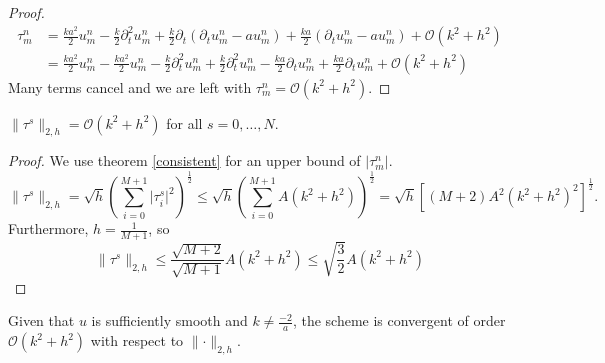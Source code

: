 \begin{proof}
    \begin{align*}
      \tau_m^n &= \frac{ka^2}{2}u_{m}^{n}  - \frac{k}{2} \partial_t^2 u_{m}^{n} + \frac{k}{2} \partial_t \left(\partial_t u_{m}^{n}   - au_{m}^{n} \right) + \frac{ka}{2} \left( \partial_t  u_{m}^{n} - a u_{m}^{n}\right)+ \mathcal{O}(k^2 + h^2) \\
                                                                                  &= \frac{ka^2}{2}u_{m}^{n} - \frac{ka^2}{2}u_{m}^{n}  - \frac{k}{2} \partial_t^2 u_{m}^{n} + \frac{k}{2} \partial_t^2 u_{m}^{n} - \frac{ka}{2} \partial_t u_{m}^{n} + \frac{ka}{2} \partial_t  u_{m}^{n}+ \mathcal{O}(k^2 + h^2)
    \end{align*}
    Many terms cancel and we are left with \( \tau_m^n = \mathcal{O}(k^2 + h^2) \).
\end{proof}

\begin{corollary}
    \label{corollary:norm_tau}
    $\lVert\tau^s \rVert_{2, h} =\mathcal{O}(k^2 + h^2)$ for all \( s = 0, \dots, N \).
\end{corollary}

\begin{proof}
We use theorem \ref{consistent} for an upper bound of $\lvert \tau_m^n\lvert$.
    $$
    \lVert\tau^s \lVert_{2, h} = \sqrt{h}\left( \sum_{i=0}^{M+1} \lvert\tau^s_i \lvert^2 \right)^\frac{1}{2} \leq \sqrt{h}\left( \sum_{i=0}^{M+1} A(k^2 + h^2) \right)^\frac{1}{2} = \sqrt{h}\left[ (M+2) A^2(k^2+h^2)^2 \right]^\frac{1}{2}.
    $$
    Furthermore, $h = \frac{1}{M+1}$, so
    $$\lVert\tau^s \lVert_{2, h}
      \le \frac{\sqrt{M+2}}{\sqrt{M+1}}A(k^2+h^2)
      \le \sqrt{ \frac{3}{2}} A(k^2+h^2) 
    $$
\end{proof}

\begin{theorem}
  \label{thm:conv_order}
    Given that $u$ is sufficiently smooth and $k \neq \frac{-2}{a}$, the scheme is convergent of order $ \mathcal{O}(k^2+h^2)$ with respect to $\lVert\cdot \lVert_{2, h}$.
\end{theorem}

